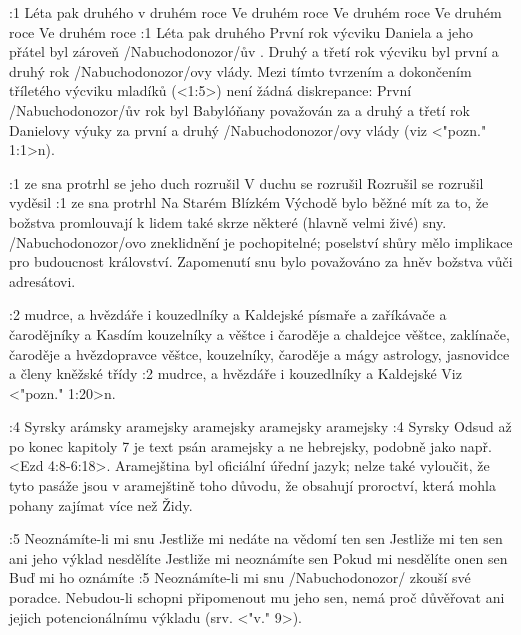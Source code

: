 :1  
    {Léta pak druhého}  %
    {v druhém roce} %
    {Ve druhém roce}  %
    {Ve druhém roce} %
    {Ve druhém roce}  %
    {Ve druhém roce}  %
:1 {Léta pak druhého} První rok výcviku Daniela a jeho přátel byl
zároveň \x/Nabuchodonozor/ův . Druhý a třetí rok výcviku byl první a druhý rok
\x/Nabuchodonozor/ovy vlády.  %
Mezi tímto tvrzením a dokončením tříletého výcviku mladíků (<1:5>) není žádná diskrepance: 
První  \x/Nabuchodonozor/ův rok byl Babylóňany považován za  a druhý a třetí rok Danielovy výuky za první a druhý  \x/Nabuchodonozor/ovy vlády (viz <"pozn." 1:1>n).

:1  
    {ze sna protrhl}  %
    {se jeho duch rozrušil} %
    {V duchu se rozrušil}  %
    {Rozrušil se} %
    {rozrušil}  %
    {vyděsil}  %
:1 {ze sna protrhl} Na Starém Blízkém Východě bylo běžné mít za to, že božstva promlouvají k lidem také skrze některé (hlavně velmi živé) sny. \x/Nabuchodonozor/ovo zneklidnění je pochopitelné; poselství shůry mělo implikace pro budoucnost království. Zapomenutí snu bylo považováno za hněv božstva vůči adresátovi.


:2
    {mudrce, a hvězdáře i kouzedlníky a Kaldejské}  %
    {písmaře a zaříkávače a čarodějníky a Kasdím} %
    {kouzelníky a věštce i čaroděje a chaldejce}  %
    {věštce, zaklínače, čaroděje a hvězdopravce} %
    {věštce, kouzelníky, čaroděje a mágy}  %
    {astrology, jasnovidce a členy kněžské třídy}  %
:2 {mudrce, a hvězdáře i kouzedlníky a Kaldejské} Viz <"pozn." 1:20>n. 


:4
    {Syrsky}  %
    {arámsky} %
    {aramejsky}  %
    {aramejsky} %
    {aramejsky}  %
    {aramejsky}  %
:4 {Syrsky} Odsud až po konec kapitoly 7 je text psán aramejsky a ne hebrejsky, podobně jako např.  <Ezd 4:8-6:18>. Aramejština byl oficiální úřední jazyk; nelze také vyloučit, že tyto pasáže jsou v aramejštině toho důvodu,  že obsahují proroctví, která mohla pohany zajímat více než Židy.

:5
    {Neoznámíte-li mi snu}  %
    {Jestliže mi nedáte na vědomí ten sen} %
    {Jestliže mi ten sen ani jeho výklad nesdělíte}  %
    {Jestliže mi neoznámíte sen} %
    {Pokud mi nesdělíte onen sen}  %
    {Buď mi ho oznámíte}  %
:5 {Neoznámíte-li mi snu} \x/Nabuchodonozor/ zkouší své poradce. Nebudou-li schopni připomenout mu jeho sen, nemá proč důvěřovat ani jejich potencionálnímu výkladu (srv. <"v." 9>).


